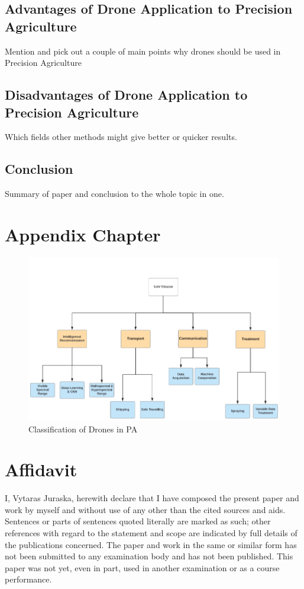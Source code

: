 \documentclass[11pt,a5paper,footinclude=true,headinclude=true, oneside]{scrbook}
\begin{document}
\section{Advantages of Drone Application to Precision Agriculture}

    Mention and pick out a couple of main points why drones should be used in Precision Agriculture

\section{Disadvantages of Drone Application to Precision Agriculture}

    Which fields other methods might give better or quicker results.

\section{Conclusion}
    Summary of paper and conclusion to the whole topic in one.


\chapter{Appendix Chapter}
    
\begin{figure}[htbp]
\centerline{\includegraphics[scale=.5]{Drone_Groups.png}}
\caption{Classification of Drones in PA \cite{Bacco_Smart_2018}}
\label{rein3}
\end{figure}


\chapter{Affidavit}
I, Vytaras Juraska, herewith declare that I have composed the present paper and work by myself and without use of any other than the cited sources and aids. Sentences or parts of sentences quoted literally are marked as such; other references with regard to the statement and scope are indicated by full details of the publications concerned. The paper and work in the same or similar form has not been submitted to any examination body and has not been published. This paper was not yet, even in part, used in another examination or as a course performance.
\end{document}
